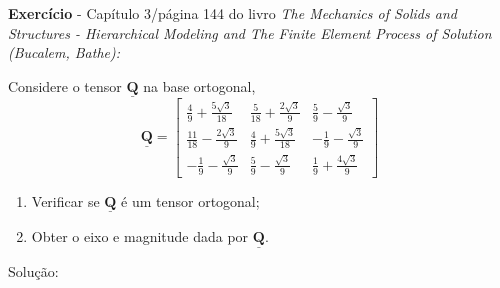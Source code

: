 \textbf{Exercício} - Capítulo 3/página 144 do livro \textit{The Mechanics of Solids and Structures - Hierarchical Modeling and The Finite Element Process of Solution (Bucalem, Bathe):}

Considere o tensor $\underline{\mathbf{Q}}$ na base ortogonal,
\[
    \underline{\mathbf{Q}}
    =
    \begin{bmatrix}
        \frac{4}{9}+\frac{5\sqrt{3}}{18} & \frac{5}{18}+\frac{2\sqrt{3}}{9} & \frac{5}{9}-\frac{\sqrt{3}}{9} \\
        \frac{11}{18}-\frac{2\sqrt{3}}{9} & \frac{4}{9}+\frac{5\sqrt{3}}{18} & -\frac{1}{9}-\frac{\sqrt{3}}{9} \\
        -\frac{1}{9}-\frac{\sqrt{3}}{9} & \frac{5}{9}-\frac{\sqrt{3}}{9} & \frac{1}{9}+\frac{4\sqrt{3}}{9}
    \end{bmatrix}
\]

\begin{enumerate}
    \item Verificar se $\underline{\mathbf{Q}}$ é um tensor ortogonal;
    \item Obter o eixo e magnitude dada por $\underline{\mathbf{Q}}$.
\end{enumerate}

Solução:

